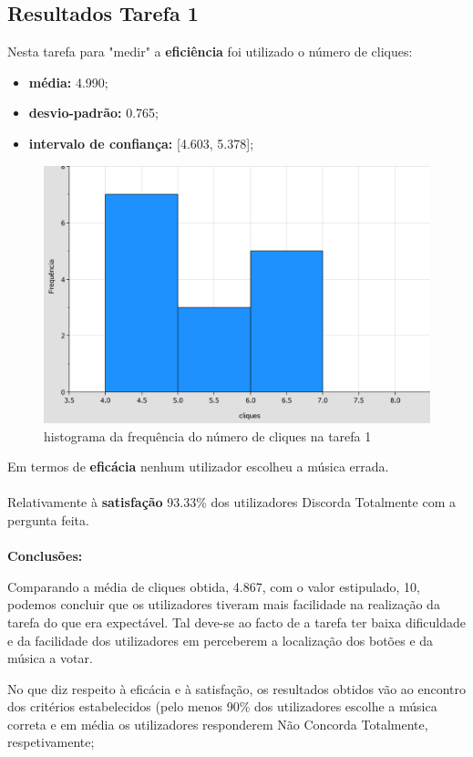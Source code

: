 \documentclass{article}
\begin{document}
\subsection*{Resultados Tarefa 1}
Nesta tarefa para "medir" a \textbf{eficiência} foi utilizado o número de cliques:
\begin{itemize}
\item\textbf{média:} 4.990;
\item\textbf{desvio-padrão:} 0.765;
\item\textbf{intervalo de confiança:} [4.603, 5.378]; 
\end{itemize}
\begin{figure}[H]
\centering
\includegraphics[scale=0.35]{grafico1}
\caption{histograma da frequência do número de cliques na tarefa 1}
\end{figure} Em termos de \textbf{eficácia} nenhum utilizador escolheu a música errada.\\\\
Relativamente à \textbf{satisfação} 93.33\% dos utilizadores Discorda Totalmente com a pergunta feita.\\\\
\textbf{Conclusões:}

Comparando a média de cliques obtida, 4.867, com o valor estipulado, 10, podemos concluir que os utilizadores tiveram mais facilidade na realização da tarefa do que era expectável. Tal deve-se ao facto de a tarefa ter baixa dificuldade e da facilidade dos utilizadores em perceberem a localização dos botões e da música a votar.

 No que diz respeito à eficácia e à satisfação, os resultados obtidos vão ao encontro dos critérios estabelecidos (pelo menos 90\% dos utilizadores escolhe a música correta e em média os utilizadores responderem Não Concorda Totalmente, respetivamente; 
\end{document}

